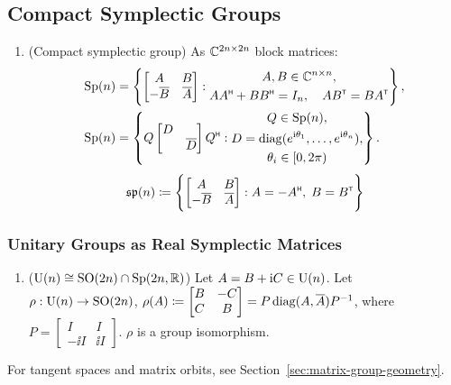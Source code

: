 \subsection{Compact Symplectic Groups}
\label{sec:compact-symplectic-groups}
\begin{enumerate}
    \item (Compact symplectic group) As $\mathbb{C}^{2n\times 2n}$ block matrices:
    \begin{align*}
    \operatorname{Sp}(n) &= \left\{ \begin{bmatrix}
        A & B \\ -\overline{B} & \overline{A}
    \end{bmatrix}: \begin{gathered}
        A,B \in \mathbb{C}^{n\times n}, \\
        AA^{\scriptscriptstyle\mathsf{H}} +BB^{\scriptscriptstyle\mathsf{H}} =I_n, \quad AB^{\scriptscriptstyle\mathsf{T}} = BA^{\scriptscriptstyle\mathsf{T}}
    \end{gathered} \right\} , \\
    \operatorname{Sp}(n) &= \left\{ Q \begin{bmatrix}
        D & \\ & \overline{D}
    \end{bmatrix} Q^{\scriptscriptstyle\mathsf{H}}: \begin{gathered}
        Q \in \operatorname{Sp}(n), \\
        D = \operatorname{diag}(e^{{\mathrm{i}}\theta_1},\dots,e^{{\mathrm{i}} \theta_n}), \\
        \theta_i \in [0, 2\pi)
    \end{gathered} \right\}.
    \end{align*}
    \[ \mathfrak{sp}(n) \coloneqq \Biggl\{ \begin{bmatrix}
        A & B \\ -\overline{B} & \overline{A}
    \end{bmatrix}: A=-A^{\scriptscriptstyle\mathsf{H}},\; B=B^{\scriptscriptstyle\mathsf{T}} \Biggr\} \]
\end{enumerate}

\subsubsection{Unitary Groups as Real Symplectic Matrices}
\begin{enumerate}
    \item ($\operatorname{U}(n) \cong \operatorname{SO}(2n) \cap \operatorname{Sp}(2n,\mathbb{R})$) Let $A=B+{\mathrm{i}} C \in \operatorname{U}(n)$. Let $\rho: \operatorname{U}(n) \to \operatorname{SO}(2n)$, $\rho(A) \coloneqq \begin{bmatrix}
        B & -C \\ C & B
    \end{bmatrix} = P \operatorname{diag}(A, \overline{A})P^{-1}$, where $P=\begin{bmatrix}
        I & I \\ -\ii I & \ii I
    \end{bmatrix}$. $\rho$ is a group isomorphism.
\end{enumerate}

For tangent spaces and matrix orbits, see Section~\ref{sec:matrix-group-geometry}.
